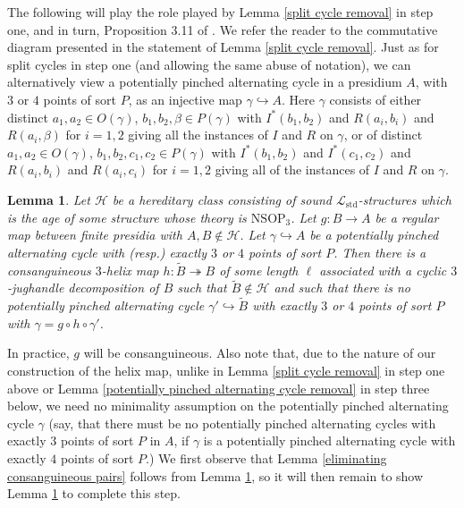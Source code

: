 \documentclass{amsart}
\newtheorem{lemma}[theorem]{Lemma}
\theoremstyle{definition}
\theoremstyle{remark}
\numberwithin{equation}{section}
\begin{document}
The following will play the role played by Lemma \ref{split cycle removal} in step one, and in turn, Proposition 3.11 of \cite{ApproxOrder}. We refer the reader to the commutative diagram presented in the statement of Lemma \ref{split cycle removal}. Just as for split cycles in step one (and allowing the same abuse of notation), we can alternatively view a potentially pinched alternating cycle in a presidium $A$, with $3$ or $4$ points of sort $P$, as an injective map $\gamma \hookrightarrow A$. Here $\gamma$ consists of either distinct $a_1, a_2 \in O(\gamma)$, $b_1, b_2, \beta \in P(\gamma)$ with $I^{*}(b_1, b_2)$ and $R(a_{i}, b_{i})$ and $R(a_i, \beta)$ for $i = 1, 2$ giving all the instances of $I$ and $R$ on $\gamma$, or of distinct $a_1, a_2 \in O(\gamma)$, $b_1, b_2, c_1, c_2 \in P(\gamma)$ with $I^{*}(b_1, b_2)$ and $I^{*}(c_1, c_2)$ and $R(a_{i}, b_{i})$ and $R(a_i, c_i)$ for $i = 1, 2$ giving all of the instances of $I$ and $R$ on $\gamma$.



\begin{lemma}
    \label{consanguineous pair removal} Let $\mathcal{H}$ be a hereditary class consisting of sound $\mathcal{L}_{\mathrm{std}}$-structures which is the age of some structure whose theory is $\mathrm{NSOP}_{3}$. Let $g: B \to A$ be a regular map between finite presidia with $A, B\notin \mathcal{H}$. Let $\gamma \hookrightarrow A$ be a potentially pinched alternating cycle with (resp.) exactly $3$ or $4$ points of sort $P$.  Then there is a consanguineous $3$-helix map $h: \tilde{B} \twoheadrightarrow B$ of some length $\ell$ associated with a cyclic $3$-jughandle decomposition of $B$ such that $\tilde{B} \notin \mathcal{H}$ and such that there is no potentially pinched alternating cycle $\gamma' \hookrightarrow \tilde{B}$ with exactly $3$ or $4$ points of sort $P$ with $\gamma = g\circ h\circ \gamma'$.



\end{lemma}

In practice, $g$ will be consanguineous. Also note that, due to the nature of our construction of the helix map, unlike in Lemma \ref{split cycle removal} in step one above or Lemma \ref{potentially pinched alternating cycle removal} in step three below, we need no minimality assumption on the potentially  pinched alternating cycle $\gamma$ (say, that there must be no potentially pinched alternating cycles with exactly $3$ points of sort $P$ in $A$, if $\gamma$ is a potentially pinched alternating cycle with exactly $4$ points of sort $P$.) We first observe that Lemma \ref{eliminating consanguineous pairs} follows from Lemma  \ref{consanguineous pair removal}, so it will then remain to show Lemma \ref{consanguineous pair removal} to complete this step.
\end{document}
